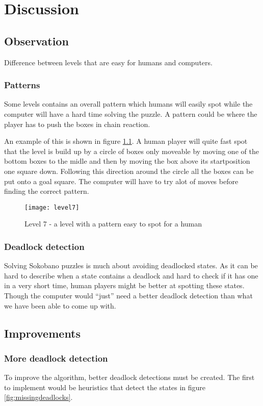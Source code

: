 
\chapter{Discussion}
\label{cha:discussion}

\section{Observation}
Difference between levels that are easy for humans and computers.

\subsection{Patterns}
Some levels contains an overall pattern which humans will easily spot while the computer will have a hard time solving the puzzle. A pattern could be where the player has to push the boxes in chain reaction.

An example of this is shown in figure \ref{fig:level7}. A human player will quite fast spot that the level is build up by a circle of boxes only moveable by moving one of the bottom boxes to the midle and then by moving the box above its startposition one square down. Following this direction around the circle all the boxes can be put onto a goal square. The computer will have to try alot of moves before finding the correct pattern.

\begin{figure}[htp]
	\centering
	\texttt{[image: level7]}
	\caption{Level 7 - a level with a pattern easy to spot for a human}
	\label{fig:level7}
\end{figure}

\subsection{Deadlock detection}
Solving Sokobano puzzles is much about avoiding deadlocked states. As
it can be hard to describe when a state contains a deadlock and hard
to check if it has one in a very short time, human players might be
better at spotting these states. Though the computer would ``just''
need a better deadlock detection than what we have been able to come
up with.

\section{Improvements}
\subsection{More deadlock detection}
To improve the algorithm, better deadlock detections must be
created. The first to implement would be heuristics that detect the
states in figure \ref{fig:missingdeadlocks}.


